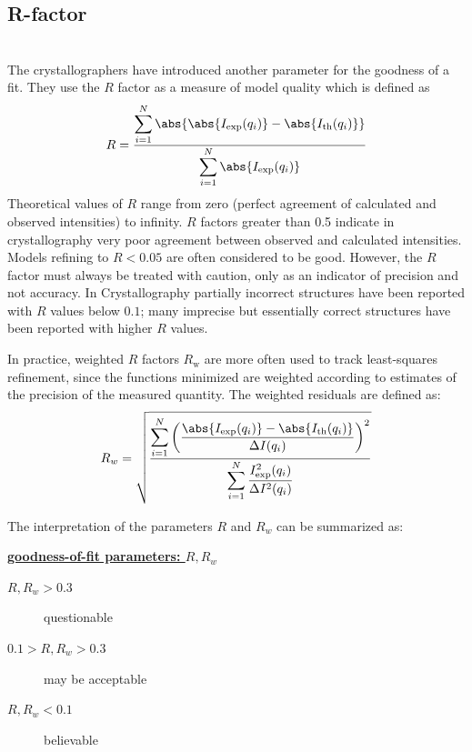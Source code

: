 \subsection{R-factor}
~\\
The crystallographers have introduced another parameter for the goodness of a fit.
They use the $R$ factor \cite{Rfactor,Hamilton1965} as a measure of model quality which is defined as
\begin{equation}\label{eqRfactor}
  R  \displaystyle  = \frac{\displaystyle\sum_{i=1}^N
\abs{\abs{I_\text{exp}(q_i)} -
\abs{I_\text{th}(q_i)}}}{\displaystyle\sum_{i=1}^N
\abs{I_\text{exp}(q_i)}}
\end{equation}
Theoretical values of $R$ range from zero (perfect
agreement of calculated and observed intensities) to infinity.  $R$
factors greater than 0.5 indicate in crystallography very poor
agreement between observed and calculated intensities. Models
refining to $R < 0.05$ are often considered to be good. However, the
$R$ factor must always be treated with caution, only as an indicator of
precision and not accuracy. In Crystallography partially incorrect
structures have been reported with $R$ values below $0.1$; many
imprecise but essentially correct structures have been reported with
higher $R$ values.

In practice, weighted $R$ factors $R_\text{w}$ are more often used
to track least-squares refinement, since the functions minimized are
weighted according to estimates of the precision of the measured
quantity. The weighted residuals are defined as:
\begin{equation} \displaystyle R_{w} =
\sqrt{\frac{\displaystyle\sum_{i=1}^N \left(\frac{\abs{I_\text{exp}(q_i)}
- \abs{I_\text{th}(q_i)}}{\Delta
I(q_i)}\right)^2}{\displaystyle\sum_{i=1}^N
\frac{I_\text{exp}^2(q_i)}{\Delta I^2(q_i)}}}
\end{equation}


The interpretation of the parameters $R$ and $R_w$ can be summarized as:

\vspace{5mm}

\uline{\bf goodness-of-fit parameters: $R,R_w$}
\begin{description}
\item[$R,R_w>0.3$] questionable
\item[$0.1 > R,R_w >0.3$] may be acceptable
\item[$R,R_w<0.1$] believable
\end{description}

